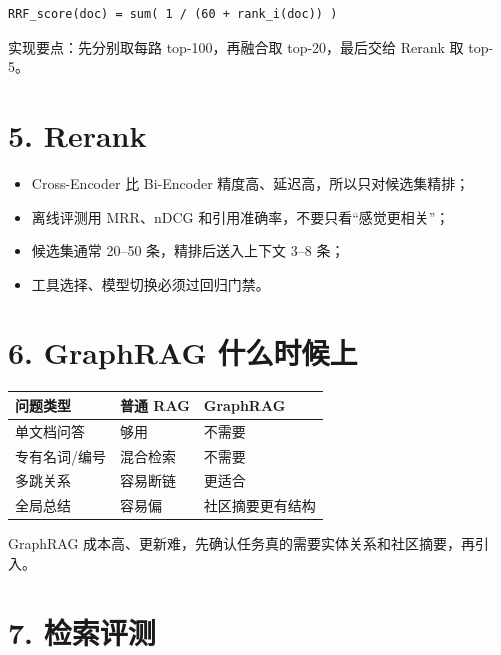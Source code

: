 \documentclass[9pt,a4paper,twocolumn]{ctexart}
\begin{document}
\begin{lstlisting}
RRF_score(doc) = sum( 1 / (60 + rank_i(doc)) )
\end{lstlisting}



实现要点：先分别取每路 top-100，再融合取 top-20，最后交给 Rerank 取 top-5。



\section*{5. Rerank}

\begin{itemize}[itemsep=1pt, topsep=2pt]
  \item Cross-Encoder 比 Bi-Encoder 精度高、延迟高，所以只对候选集精排；
  \item 离线评测用 MRR、nDCG 和引用准确率，不要只看“感觉更相关”；
  \item 候选集通常 20–50 条，精排后送入上下文 3–8 条；
  \item 工具选择、模型切换必须过回归门禁。
\end{itemize}


\section*{6. GraphRAG 什么时候上}

{\footnotesize
\begin{tabular}{|p{}|p{}|p{}|}
\hline
\textbf{问题类型} & \textbf{普通 RAG} & \textbf{GraphRAG} \\
\hline
单文档问答 & 够用 & 不需要 \\
\hline
专有名词/编号 & 混合检索 & 不需要 \\
\hline
多跳关系 & 容易断链 & 更适合 \\
\hline
全局总结 & 容易偏 & 社区摘要更有结构 \\
\hline
\end{tabular}
}



GraphRAG 成本高、更新难，先确认任务真的需要实体关系和社区摘要，再引入。



\section*{7. 检索评测}
\end{document}
